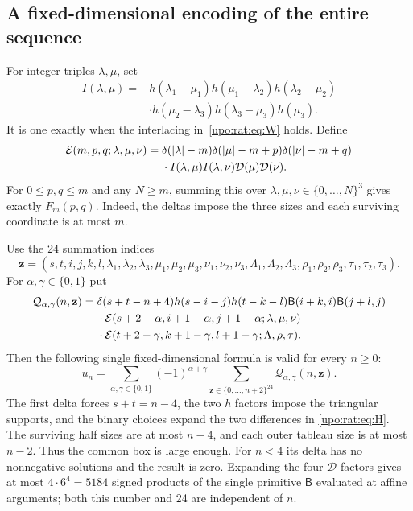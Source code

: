 \documentclass[11pt,letterpaper]{article}
\theoremstyle{remark}\newtheorem{remark}[theorem]{Remark}
\numberwithin{equation}{section}
\begin{document}
\subsection{A fixed-dimensional encoding of the entire sequence}
For integer triples $\lambda,\mu$, set
\begin{align*}
I(\lambda,\mu)={}&h(\lambda_1-\mu_1)h(\mu_1-\lambda_2)
h(\lambda_2-\mu_2)\\[-2pt]
&\cdot h(\mu_2-\lambda_3)h(\lambda_3-\mu_3)h(\mu_3).
\end{align*}
It is one exactly when the interlacing in~\eqref{upo:rat:eq:W} holds. Define
\begin{align}\label{upo:rat:eq:Eencoding}
\mathcal E(m,p,q;\lambda,\mu,\nu)={}&
\delta(|\lambda|-m)\delta(|\mu|-m+p)\delta(|\nu|-m+q)\notag\\
&\cdot I(\lambda,\mu)I(\lambda,\nu)\mathcal D(\mu)\mathcal D(\nu).
\end{align}
For $0\le p,q\le m$ and any $N\ge m$, summing this over
$\lambda,\mu,\nu\in\{0,\ldots,N\}^3$ gives exactly $F_m(p,q)$.
Indeed, the deltas impose the three sizes and each surviving coordinate
is at most $m$.

Use the 24 summation indices
\[
\mathbf z=(s,t,i,j,k,l,\lambda_1,\lambda_2,\lambda_3,
\mu_1,\mu_2,\mu_3,\nu_1,\nu_2,\nu_3,
\Lambda_1,\Lambda_2,\Lambda_3,
\rho_1,\rho_2,\rho_3,\tau_1,\tau_2,\tau_3).
\]
For $\alpha,\gamma\in\{0,1\}$ put
\begin{align}\label{upo:rat:eq:Qencoding}
\mathcal Q_{\alpha,\gamma}(n,\mathbf z)={}&
\delta(s+t-n+4)h(s-i-j)h(t-k-l)
\mathsf B(i+k,i)\mathsf B(j+l,j)\notag\\
&\cdot\mathcal E(s+2-\alpha,i+1-\alpha,j+1-\alpha;\lambda,\mu,\nu)
\notag\\
&\cdot\mathcal E(t+2-\gamma,k+1-\gamma,l+1-\gamma;\Lambda,\rho,\tau).
\end{align}
Then the following single fixed-dimensional formula is valid for every
$n\ge0$:
\begin{equation}\label{upo:rat:eq:boxsum}
u_n=\sum_{\alpha,\gamma\in\{0,1\}}(-1)^{\alpha+\gamma}
\sum_{\mathbf z\in\{0,\ldots,n+2\}^{24}}
\mathcal Q_{\alpha,\gamma}(n,\mathbf z).
\end{equation}
The first delta forces $s+t=n-4$, the two $h$ factors impose the triangular
supports, and the binary choices expand the two differences in
\eqref{upo:rat:eq:H}. The surviving half sizes are at most $n-4$, and each outer
tableau size is at most $n-2$. Thus the common box is large enough.
For $n<4$ its delta has no nonnegative solutions and the result is zero.
Expanding the four $\mathcal D$ factors gives at most
$4\cdot6^4=5184$ signed products of the single primitive $\mathsf B$
evaluated at affine arguments; both this number and 24 are independent
of $n$.
\end{document}
